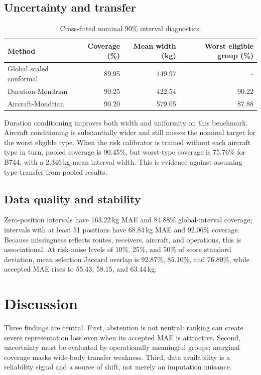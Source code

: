 \documentclass[11pt]{article}
\begin{document}
\subsection{Uncertainty and transfer}
\begin{table}[ht]
\centering
\caption{Cross-fitted nominal 90\% interval diagnostics.}
\begin{tabular}{lrrr}
\toprule
Method & Coverage (\%) & Mean width (kg) & Worst eligible group (\%)\\
\midrule
Global scaled conformal & 89.95 & 449.97 & --\\
Duration-Mondrian & 90.25 & 422.54 & 90.22\\
Aircraft-Mondrian & 90.20 & 579.05 & 87.88\\
\bottomrule
\end{tabular}
\end{table}

Duration conditioning improves both width and uniformity on this benchmark. Aircraft conditioning is substantially wider and still misses the nominal target for the worst eligible type. When the risk calibrator is trained without each aircraft type in turn, pooled coverage is 90.45\%, but worst-type coverage is 75.76\% for B744, with a 2,346\,kg mean interval width. This is evidence against assuming type transfer from pooled results.

\subsection{Data quality and stability}
Zero-position intervals have 163.22\,kg MAE and 84.88\% global-interval coverage; intervals with at least 51 positions have 68.84\,kg MAE and 92.06\% coverage. Because missingness reflects routes, receivers, aircraft, and operations, this is associational. At risk-noise levels of 10\%, 25\%, and 50\% of score standard deviation, mean selection Jaccard overlap is 92.87\%, 85.10\%, and 76.80\%, while accepted MAE rises to 55.43, 58.15, and 63.44\,kg.

\section{Discussion}
Three findings are central. First, abstention is not neutral: ranking can create severe representation loss even when its accepted MAE is attractive. Second, uncertainty must be evaluated by operationally meaningful groups; marginal coverage masks wide-body transfer weakness. Third, data availability is a reliability signal and a source of shift, not merely an imputation nuisance.
\end{document}
